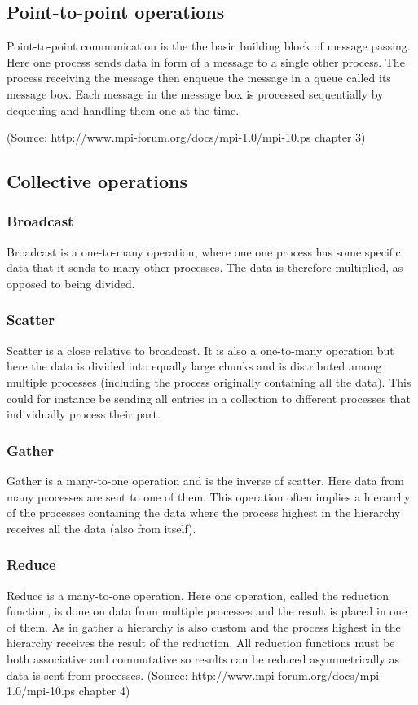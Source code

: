 \subsection{Point-to-point operations}
Point-to-point communication is the the basic building block of message passing. Here one process sends data in form of a message to a single other process. The process receiving the message then enqueue the message in a queue called its message box. Each message in the message box is processed sequentially by dequeuing and handling them one at the time.

(Source: http://www.mpi-forum.org/docs/mpi-1.0/mpi-10.ps chapter 3)

\subsection{Collective operations}
\subsubsection{Broadcast}
Broadcast is a one-to-many operation, where one one process has some specific data that it sends to many other processes. The data is therefore multiplied, as opposed to being divided.

\subsubsection{Scatter}
Scatter is a close relative to broadcast. It is also a one-to-many operation but here the data is divided into equally large chunks and is distributed among multiple processes (including the process originally containing all the data). This could for instance be sending all entries in a collection to different processes that individually process their part.

\subsubsection{Gather}
Gather is a many-to-one operation and is the inverse of scatter. Here data from many processes are sent to one of them. This operation often implies a hierarchy of the processes containing the data where the process highest in the hierarchy receives all the data (also from itself).

\subsubsection{Reduce}
Reduce is a many-to-one operation. Here one operation, called the reduction function, is done on data from multiple processes and the result is placed in one of them. As in gather a hierarchy is also custom and the process highest in the hierarchy receives the result of the reduction. All reduction functions must be both associative and commutative so results can be reduced asymmetrically as data is sent from processes.
(Source: http://www.mpi-forum.org/docs/mpi-1.0/mpi-10.ps chapter 4)

